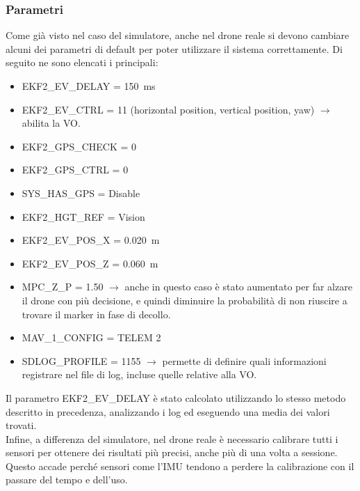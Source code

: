 \subsubsection{Parametri}
Come già visto nel caso del simulatore, anche nel drone reale si devono cambiare alcuni dei parametri di default per poter utilizzare il sistema correttamente. Di seguito ne sono elencati i principali:
\begin{itemize}
	\item EKF2\_EV\_DELAY = \SI{150}{\milli\second}
	\item EKF2\_EV\_CTRL = 11 (horizontal position, vertical position, yaw) $\rightarrow$ abilita la VO.
	\item EKF2\_GPS\_CHECK = 0
	\item EKF2\_GPS\_CTRL = 0
	\item SYS\_HAS\_GPS = Disable
	\item EKF2\_HGT\_REF = Vision
	\item EKF2\_EV\_POS\_X = \SI{0.020}{\meter}
	\item EKF2\_EV\_POS\_Z = \SI{0.060}{\meter}
	\item MPC\_Z\_P = 1.50 $\rightarrow$ anche in questo caso è stato aumentato per far alzare il drone con più decisione, e quindi diminuire la probabilità di non riuscire a trovare il marker in fase di decollo.
	\item MAV\_1\_CONFIG = TELEM 2
	\item SDLOG\_PROFILE = 1155 $\rightarrow$ permette di definire quali informazioni registrare nel file di log, incluse quelle relative alla VO.
\end{itemize} 
Il parametro EKF2\_EV\_DELAY è stato calcolato utilizzando lo stesso metodo descritto in precedenza, analizzando i log ed eseguendo una media dei valori trovati. \\
Infine, a differenza del simulatore, nel drone reale è necessario calibrare tutti i sensori per ottenere dei risultati più precisi, anche più di una volta a sessione. Questo accade perché sensori come l'IMU tendono a perdere la calibrazione con il passare del tempo e dell'uso.

